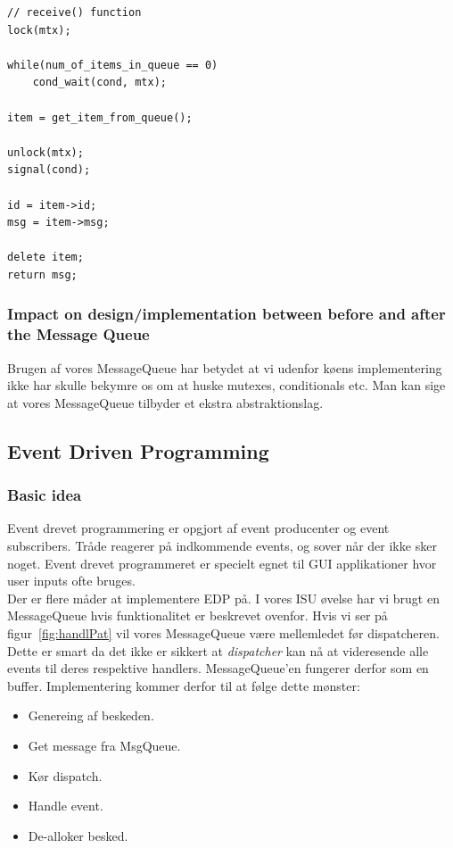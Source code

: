 \begin{lstlisting}[morekeywords={unlock, lock, signal, cond_wait}]
// receive() function
lock(mtx);

while(num_of_items_in_queue == 0)
	cond_wait(cond, mtx);

item = get_item_from_queue();

unlock(mtx);
signal(cond);

id = item->id;
msg = item->msg;

delete item;
return msg;
\end{lstlisting}

\subsubsection{Impact on design/implementation between before and after the Message Queue}

Brugen af vores MessageQueue har betydet at vi udenfor køens implementering ikke har skulle bekymre os om at huske mutexes, conditionals etc. Man kan sige at vores MessageQueue tilbyder et ekstra abstraktionslag.

\subsection{Event Driven Programming}

\subsubsection{Basic idea}
Event drevet programmering er opgjort af event producenter og event subscribers.
Tråde reagerer på indkommende events, og sover når der ikke sker noget.
Event drevet programmeret er specielt egnet til GUI applikationer hvor user inputs ofte bruges. \\

Der er flere måder at implementere EDP på. I vores ISU øvelse har vi brugt en MessageQueue hvis funktionalitet er beskrevet ovenfor.
Hvis vi ser på figur~\ref{fig:handlPat} vil vores MessageQueue være mellemledet før dispatcheren. Dette er smart da det ikke er sikkert at \textit{dispatcher} kan nå at videresende alle events til deres respektive handlers. MessageQueue'en fungerer derfor som en buffer.
Implementering kommer derfor til at følge dette mønster:
\begin{itemize}
	\item Genereing af beskeden.
	\item Get message fra MsgQueue.
	\item Kør dispatch.
	\item Handle event.
	\item De-alloker besked.
\end{itemize}

